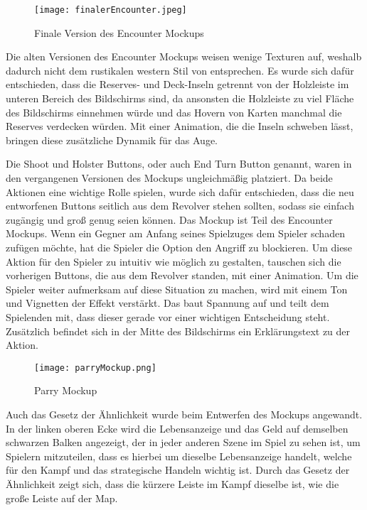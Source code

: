 \begin{figure}[H]
    \centering
    \texttt{[image: finalerEncounter.jpeg]}
    \caption{Finale Version des Encounter Mockups}
\end{figure}

Die alten Versionen des Encounter Mockups weisen wenige Texturen auf, weshalb dadurch nicht dem rustikalen western Stil von \FF entsprechen. Es wurde sich dafür entschieden, dass die Reserves- und Deck-Inseln getrennt von der Holzleiste im unteren Bereich des Bildschirms sind, da ansonsten die Holzleiste zu viel Fläche des Bildschirms einnehmen würde und das Hovern von Karten manchmal die Reserves verdecken würden. Mit einer Animation, die die Inseln schweben lässt, bringen diese zusätzliche Dynamik für das Auge.

Die Shoot und Holster Buttons, oder auch End Turn Button genannt, waren in den vergangenen Versionen des Mockups ungleichmäßig platziert. Da beide Aktionen eine wichtige Rolle spielen, wurde sich dafür entschieden, dass die neu entworfenen Buttons seitlich aus dem Revolver stehen sollten, sodass sie einfach zugängig und groß genug seien können.
Das  Mockup ist Teil des Encounter Mockups. Wenn ein Gegner am Anfang seines Spielzuges dem Spieler schaden zufügen möchte, hat die Spieler die Option den Angriff zu blockieren. Um diese Aktion für den Spieler zu intuitiv wie möglich zu gestalten, tauschen sich die vorherigen Buttons, die aus dem Revolver standen, mit einer Animation. Um die Spieler weiter aufmerksam auf diese Situation zu machen, wird mit einem Ton und Vignetten der Effekt verstärkt. Das baut Spannung auf und teilt dem Spielenden mit, dass dieser gerade vor einer wichtigen Entscheidung steht. Zusätzlich befindet sich in der Mitte des Bildschirms ein Erklärungstext zu der Aktion.

\begin{figure}[H]
    \centering
    \texttt{[image: parryMockup.png]}
    \caption{Parry Mockup}
\end{figure}

Auch das Gesetz der Ähnlichkeit wurde beim Entwerfen des Mockups angewandt. In der linken oberen Ecke wird die Lebensanzeige und das Geld auf demselben schwarzen Balken angezeigt, der in jeder anderen Szene im Spiel zu sehen ist, um Spielern mitzuteilen, dass es hierbei um dieselbe Lebensanzeige handelt, welche für den Kampf und das strategische Handeln wichtig ist. Durch das Gesetz der Ähnlichkeit zeigt sich, dass die kürzere Leiste im Kampf dieselbe ist, wie die große Leiste auf der Map.

